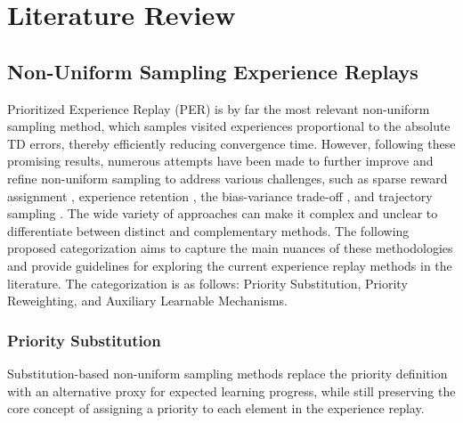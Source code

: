 
\chapter{Literature Review}

\section{Non-Uniform Sampling Experience Replays}

Prioritized Experience Replay (PER) \cite{schaul2015prioritized} is by far the most relevant non-uniform sampling method, which samples visited experiences proportional to the absolute TD errors, thereby efficiently reducing convergence time. However, following these promising results, numerous attempts have been made to further improve and refine non-uniform sampling to address various challenges, such as sparse reward assignment \cite{andrychowicz2017hindsight, dai2021diversity}, experience retention \cite{de2018experience}, the bias-variance trade-off \cite{fedus2020revisiting, hessel2018rainbow, sutton1988learning, sutton2018reinforcement}, and trajectory sampling \cite{dai2021diversity, liu2023prioritized}. The wide variety of approaches can make it complex and unclear to differentiate between distinct and complementary methods. The following proposed categorization aims to capture the main nuances of these methodologies and provide guidelines for exploring the current experience replay methods in the literature. The categorization is as follows: Priority Substitution, Priority Reweighting, and Auxiliary Learnable Mechanisms.

\subsection{Priority Substitution}


Substitution-based non-uniform sampling methods replace the priority definition with an alternative proxy for expected learning progress, while still preserving the core concept of assigning a priority to each element in the experience replay.
 

